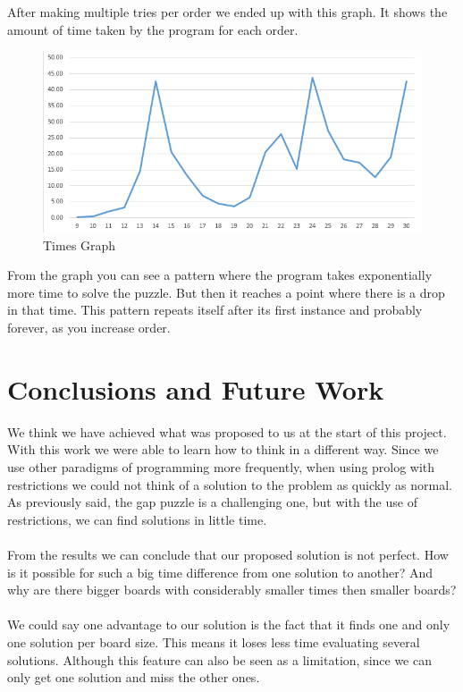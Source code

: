 \documentclass[runningheads]{llncs}
\begin{document}
After making multiple tries per order we ended up with this graph. It shows the amount of time taken by the program for
each order.
\begin{figure}
    \begin{center}
        \includegraphics[scale=0.5]{images/graph.png}
        \caption{Times Graph} \label{fig5}
    \end{center}
\end{figure}
From the graph you can see a pattern where the program takes exponentially more time to solve the puzzle. But then it
reaches a point where there is a drop in that time. This pattern repeats itself after its first instance and probably forever, as you increase order.


\section{Conclusions and Future Work}
We think we have achieved what was proposed to us at the start of this project. With this work we were able to learn how to think in a different way.
Since we use other paradigms of programming more frequently, when using prolog with restrictions we could not think of a solution to the problem as quickly as normal.
As previously said, the gap puzzle is a challenging one, but with the use of restrictions, we can find solutions in little time.
\paragraph{}
From the results we can conclude that our proposed solution is not perfect. How is it possible for such a big time difference from one solution to another?
And why are there bigger boards with considerably smaller times then smaller boards?
\paragraph{}
We could say one advantage to our solution is the fact that it finds one and only one solution per board size. This means it loses less time evaluating several solutions.
Although this feature can also be seen as a limitation, since we can only get one solution and miss the other ones.
\end{document}
